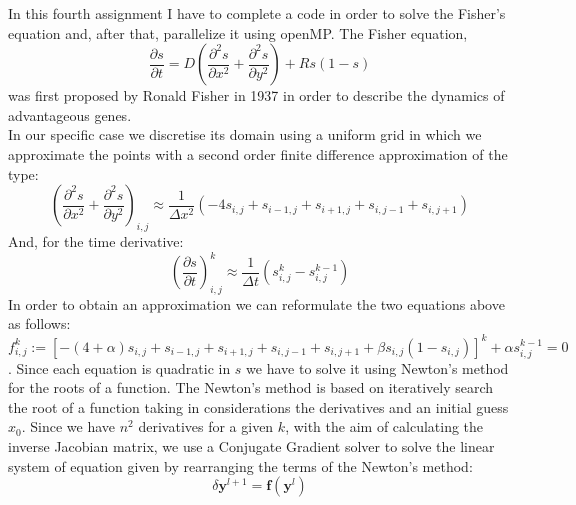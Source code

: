 \documentclass[unicode,11pt,a4paper,oneside,numbers=endperiod,openany]{scrartcl}
\begin{document}
\setassignment
{}

\newline

\assignmentpolicy



In this fourth assignment I have to complete a code in order to solve the Fisher's equation and, after that, parallelize it using openMP. The Fisher equation,
\begin{equation*}
	\frac{\partial s}{\partial t} = D \left(\frac{\partial^2 s}{\partial x^2} + \frac{\partial^2 s}{\partial y^2} \right) + Rs(1-s)
\end{equation*}
was first proposed by Ronald Fisher in 1937 in order to describe the dynamics of advantageous genes.\\
In our specific case we discretise its domain using a uniform grid in which we approximate the points with a second order finite difference approximation of the type:
\begin{equation*}
	\left(\frac{\partial^2 s}{\partial x^2} + \frac{\partial^2 s}{\partial y^2} \right)_{i,j} \approx \frac{1}{\Delta x^2} (-4s_{i,j}+s_{i-1,j}+s_{i+1,j}+s_{i,j-1}+s_{i,j+1})
\end{equation*}
And, for the time derivative: 
\begin{equation*}
	\left(\frac{\partial s}{\partial t}  \right)^k_{i,j} \approx \frac{1}{\Delta t}(s^k_{i,j} - s^{k-1}_{i,j})
\end{equation*}
In order to obtain an approximation we can reformulate the two equations above as follows: 
\begin{equation}\label{eq:s}
	f^k_{i,j} := [-(4+\alpha)s_{i,j}+s_{i-1,j}+ s_{i+1,j}+s_{i,j-1}+ s_{i,j+1}+ \beta s_{i,j}(1- s_{i,j})]^k + \alpha s^{k-1}_{i,j} = 0 
\end{equation}.
Since each equation is quadratic in $s$ we have to solve it using Newton's method for the roots of a function. The Newton's method is based on iteratively search the root of a function taking in considerations the derivatives and an initial guess $x_0$. Since we have $n^2$ derivatives for a given $k$, with the aim of calculating the inverse Jacobian matrix, we use a Conjugate Gradient solver to solve the linear system of equation given by rearranging the terms of the Newton's method:
\begin{equation*}
	[\mathbf{J}_{\mathbf{f}}(\mathbf{y}^l)]\delta \mathbf{y}^{l+1} = \mathbf{f}(\mathbf{y}^l)
\end{equation*}
\end{document}
